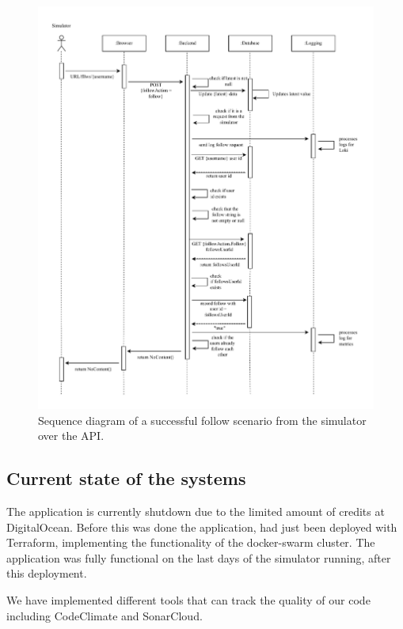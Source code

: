 \begin{figure}[H]
  \begin{center}
\includegraphics[width=\textwidth]{images/figures/Sequence-api.pdf}
    \caption{Sequence diagram of a successful follow scenario from the simulator over the API.}
    \label{fig:apicontroller}
  \end{center}
\end{figure}


\subsection{Current state of the systems}
The application is currently shutdown due to the limited amount of credits at DigitalOcean. 
Before this was done the application, had just been deployed with Terraform, implementing the functionality of the docker-swarm cluster. The application was fully functional on the last days of the simulator running, after this deployment.\newline

We have implemented different tools that can track the quality of our code including CodeClimate and SonarCloud.

